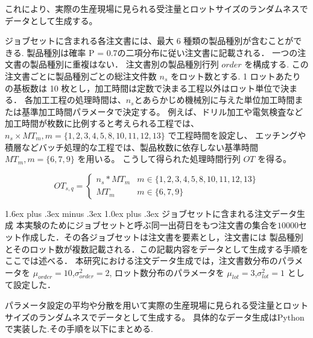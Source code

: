 \documentclass{jarticle}
\makeatletter
\renewcommand{\subsection}{%
  \@startsection{subsection}{2}{\z@}%
  {1.6ex plus .3ex minus .3ex}%
  {1.0ex plus .3ex}%
  {\LARGE\bfseries}%
}
\makeatother
\begin{document}
これにより、実際の生産現場に見られる受注量とロットサイズのランダムネスでデータとして生成する。

ジョブセットに含まれる各注文書には、最大 $6$ 種類の製品種別が含むことができる.
製品種別は確率 P = 0.7の二項分布に従い注文書に記載される．
一つの注文書の製品種別に重複はない．
注文書別の製品種別行列 $order$ を構成する.
この注文書ごとに製品種別ごとの総注文件数 $n_{s}$ をロット数とする.
1 ロットあたりの基板数は 10 枚とし，加工時間は定数で決まる工程以外はロット単位で決まる．
各加工工程の処理時間は、$n_{s}$とあらかじめ機械別に与えた単位加工時間または基準加工時間パラメータで決定する。
例えば、ドリル加工や電気検査など加工時間が枚数に比例すると考えられる工程では、$n_{s} \times MT_{m},m = \{1,2,3,4,5,8,10,11,12,13\}$ で工程時間を設定し、
エッチングや積層などバッチ処理的な工程では、製品枚数に依存しない基準時間 $MT_{m},m = \{6,7,9\}$ を用いる。
こうして得られた処理時間行列 $OT$ を得る。

\begin{equation}
OT_{s,q}=
\begin{cases}
n_{s} * MT_{m} & m \in \{1,2,3,4,5,8,10,11,12,13\} \\
MT_{m}            & m \in \{6,7,9\}
\end{cases}
\label{eq:OT_definition}
\end{equation}

\subsection{ジョブセットに含まれる注文データ生成}
本実験のためにジョブセットと呼ぶ同一出荷日をもつ注文書の集合を$10000$セット作成した．その各ジョブセットは注文書を要素とし，注文書には
製品種別とそのロット数が複数記載される．この記載内容をデータとして生成する手順をここでは述べる．
本研究における注文データ生成では，注文書数分布のパラメータを
$\mu_{order}=10$,$\sigma^2_{order}=2$,
ロット数分布のパラメータを
$\mu_{lot}=3$,$\sigma^2_{lot}=1$
として設定した．

パラメータ設定の平均や分散を用いて実際の生産現場に見られる受注量とロットサイズのランダムネスでデータとして生成する。
具体的なデータ生成はPythonで実装した.その手順を以下にまとめる.
\end{document}
